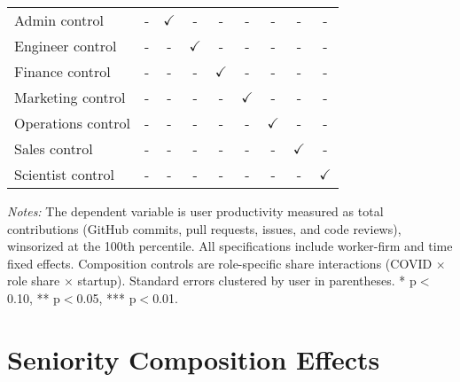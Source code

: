 \documentclass[11pt]{article}
\begin{document}
\begin{table}[H]
\begin{adjustbox}{width=\textwidth}
\begin{tabular}{l*{8}{c}}
\midrule
Admin control & - & $\checkmark$ & - & - & - & - & - & - \\
Engineer control & - & - & $\checkmark$ & - & - & - & - & - \\
Finance control & - & - & - & $\checkmark$ & - & - & - & - \\
Marketing control & - & - & - & - & $\checkmark$ & - & - & - \\
Operations control & - & - & - & - & - & $\checkmark$ & - & - \\
Sales control & - & - & - & - & - & - & $\checkmark$ & - \\
Scientist control & - & - & - & - & - & - & - & $\checkmark$ \\
\bottomrule
\end{tabular}
\end{adjustbox}
\begin{tablenotes}
\small
\item \textit{Notes:} The dependent variable is user productivity measured as total contributions (GitHub commits, pull requests, issues, and code reviews), winsorized at the 100th percentile. 
All specifications include worker-firm and time fixed effects. 
Composition controls are role-specific share interactions (COVID $\times$ role share $\times$ startup).
Standard errors clustered by user in parentheses. 
* p$<$0.10, ** p$<$0.05, *** p$<$0.01.
\end{tablenotes}
\end{table}

\section{Seniority Composition Effects}
\end{document}
